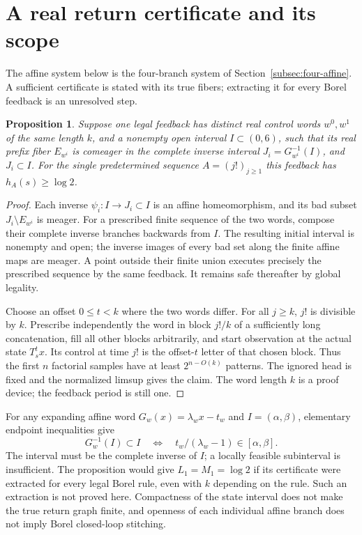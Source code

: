 \documentclass[11pt,reqno]{amsart}
\numberwithin{equation}{section}
\newtheorem{proposition}[theorem]{Proposition}
\theoremstyle{definition}
\begin{document}
\section{A real return certificate and its scope}
\label{app:returns}
The affine system below is the four-branch system of
Section~\ref{subsec:four-affine}. A sufficient certificate is stated
with its true fibers; extracting it for every Borel feedback is an
unresolved step.

\begin{proposition}\label{prop:return-certificate}
Suppose one legal feedback has distinct real control words $w^0,w^1$
of the same length $k$, and a nonempty open interval $I\subset(0,6)$,
such that its real prefix fiber $E_{w^i}$ is comeager in the complete
inverse interval $J_i=G_{w^i}^{-1}(I)$, and $J_i\subset I$.
For the single predetermined sequence $A=(j!)_{j\ge1}$ this
feedback has $h_A(s)\ge\log2$.
\end{proposition}
\begin{proof}
Each inverse $\psi_i:I\to J_i\subset I$ is an affine
homeomorphism, and its bad subset $J_i\setminus E_{w^i}$ is
meager. For a prescribed finite sequence of the two words, compose
their complete inverse branches backwards from $I$. The resulting
initial interval is nonempty and open; the inverse images of every
bad set along the finite affine maps are meager. A point outside
their finite union executes precisely the prescribed sequence by
the same feedback. It remains safe thereafter by global legality.

Choose an offset $0\le t<k$ where the two words differ. For
all $j\ge k$, $j!$ is divisible by $k$. Prescribe independently
the word in block $j!/k$ of a sufficiently long concatenation,
fill all other blocks arbitrarily, and start observation at the
actual state $T_s^t x$. Its control at time $j!$ is the offset-$t$
letter of that chosen block. Thus the first $n$ factorial samples
have at least $2^{n-O(k)}$ patterns. The ignored head is fixed
and the normalized limsup gives the claim. The word length $k$
is a proof device; the feedback period is still one.
\end{proof}

For any expanding affine word $G_w(x)=\lambda_w x-t_w$ and
$I=(\alpha,\beta)$, elementary endpoint inequalities give
\[
 G_w^{-1}(I)\subset I
 \quad\Longleftrightarrow\quad
 t_w/(\lambda_w-1)\in[\alpha,\beta].
\]
The interval must be the complete inverse of $I$; a locally feasible
subinterval is insufficient. The proposition would give
$L_1=M_1=\log2$ if its certificate were extracted for every
legal Borel rule, even with $k$ depending on the rule. Such an
extraction is not proved here. Compactness of the state interval
does not make the true return graph finite, and openness of each
individual affine branch does not imply Borel closed-loop stitching.
\end{document}
